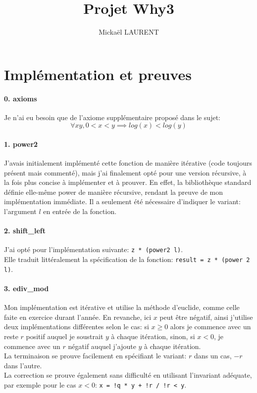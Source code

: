 \documentclass[a4paper]{article}%
\title{\vspace{1.5cm}Projet Why3}
\author{Mickaël LAURENT}
\date{\vspace{-5ex}}
\begin{document}
	\maketitle

	\section{Implémentation et preuves}

	\paragraph{0. axioms}
	Je n'ai eu besoin que de l'axiome supplémentaire proposé dans le sujet:
	\[\forall xy, 0 < x < y \implies log(x) < log(y)\]

	\paragraph{1. power2}
	J'avais initialement implémenté cette fonction de manière itérative (code toujours présent mais commenté),
	mais j'ai finalement opté pour une version récursive, à la fois plus concise à implémenter et à prouver.
	En effet, la bibliothèque standard définie elle-même power de manière récursive, rendant la preuve de mon implémentation immédiate.
	Il a seulement été nécessaire d'indiquer le variant: l'argument $l$ en entrée de la fonction.

	\paragraph{2. shift\_left}
	J'ai opté pour l'implémentation suivante:  \texttt{z * (power2 l)}.\\
	Elle traduit littéralement la spécification de la fonction: \texttt{result = z * (power 2 l)}.

	\paragraph{3. ediv\_mod}
	Mon implémentation est itérative et utilise la méthode d'euclide, comme celle faite en exercice durant l'année.
	En revanche, ici $x$ peut être négatif, ainsi j'utilise deux implémentations différentes selon le cas:
	si $x \geq 0$ alors je commence avec un reste $r$ positif auquel je soustrait $y$ à chaque itération, sinon, si $x < 0$,
	je commence avec un $r$ négatif auquel j'ajoute $y$ à chaque itération.\\
	La terminaison se prouve facilement en spécifiant le variant: $r$ dans un cas, $-r$ dans l'autre.\\
	La correction se prouve également sans difficulté en utilisant l'invariant adéquate, par exemple pour le cas $x < 0$:
	\texttt{x = !q * y + !r /\ !r < y}.
\end{document}
